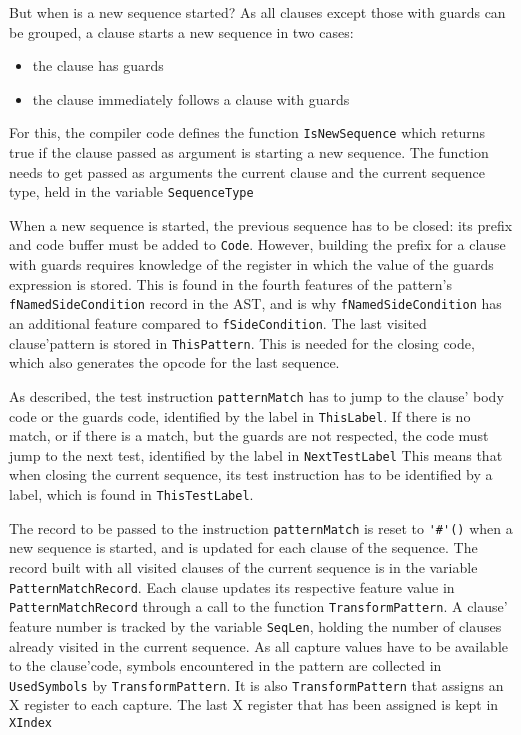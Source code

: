 \documentclass[a4paper]{memoir}
\begin{document}
But when is a new sequence started? As all clauses except those with guards can
be grouped, a clause starts a new sequence in two cases:
\begin{itemize}
  \item the clause has guards
  \item the clause immediately follows a clause with guards
\end{itemize}

For this, the compiler code defines the function
\lstinline!IsNewSequence! which returns true if the clause passed as argument
is starting a new sequence. The function needs to get passed as arguments the current clause and
the current sequence type, held in the variable \lstinline!SequenceType!

\label{sec:codegen:fNamedSideCondition}When a new sequence is started, the previous sequence has to be closed: its
prefix and code buffer must be added to \lstinline!Code!. However, building the
prefix for a clause with guards requires knowledge of the register in which the
value of the guards expression is stored. This is found in the fourth features
of the pattern's \lstinline!fNamedSideCondition! record in the AST, and is why
 \lstinline!fNamedSideCondition! has an additional feature compared to
 \lstinline!fSideCondition!.
The last visited clause'pattern is stored in \lstinline!ThisPattern!. This is
needed for the closing code, which also generates the opcode for the last sequence.

As described, the test instruction \lstinline!patternMatch! has to jump to the
clause' body code or the guards code, identified by the label in
\lstinline!ThisLabel!. If there is no match, or if there is a match, but the
guards are not respected, the code must jump to the next test, identified by the
label in \lstinline!NextTestLabel!
This means that when closing the current sequence, its test instruction has to
be identified by a label, which is found in \lstinline!ThisTestLabel!.

The record to be passed to the instruction \lstinline!patternMatch! is reset to
\lstinline!'#'()! when a new sequence is started, and is updated for each clause
of the sequence. The record built with all visited clauses of the current
sequence is in the variable \lstinline!PatternMatchRecord!.
Each clause updates its respective feature value in
\lstinline!PatternMatchRecord! through a call to the function \lstinline!TransformPattern!.
A clause' feature number is tracked by the
variable \lstinline!SeqLen!, holding the number of clauses already visited in
the current sequence.
As all capture values have to be available to the clause'code, symbols encountered
in the pattern are collected in \lstinline!UsedSymbols! by
\lstinline!TransformPattern!. It is also \lstinline!TransformPattern! that
assigns an X register to each capture. The last X register that has been
assigned is kept in \lstinline!XIndex!
\end{document}
